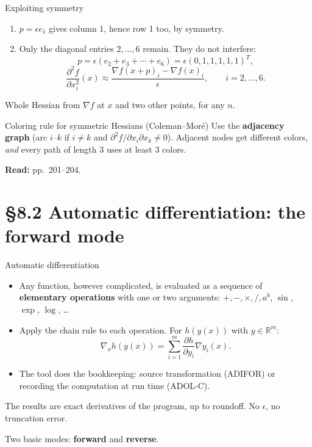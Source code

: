 \documentclass[12pt,aspectratio=169]{beamer}
\newcommand{\readpp}[1]{{\color{red!80!black}\textbf{Read:} #1}}
\newcommand{\eps}{\epsilon}
\newcommand{\R}{\mathbb{R}}
\begin{document}
\begin{frame}{Exploiting symmetry}
  \begin{enumerate}
    \item $p=\eps e_1$ gives column 1, hence row 1 too, by symmetry.
    \item Only the diagonal entries $2,\dots,6$ remain. They do not interfere:
      \begin{equation}
        p = \eps(e_2+e_3+\cdots+e_6) = \eps(0,1,1,1,1,1)^T, \tag{8.24}
      \end{equation}
      \[
        \frac{\partial^2 f}{\partial x_i^2}(x)\approx\frac{\nabla f(x+p)_i-\nabla f(x)_i}{\eps},\qquad i=2,\dots,6.
      \]
  \end{enumerate}
  \alert{Whole Hessian from $\nabla f$ at $x$ and two other points}, for any $n$.

  \begin{block}{Coloring rule for symmetric Hessians (Coleman--Mor\'e)}
    Use the \textbf{adjacency graph} (arc $i$--$k$ if $i\neq k$ and $\partial^2 f/\partial x_i\partial x_k\neq0$).
    Adjacent nodes get different colors, \emph{and} every path of length 3 uses at least 3 colors.
  \end{block}
  \readpp{pp.~201--204.}
\end{frame}

\section{\S8.2 Automatic differentiation: the forward mode}

\begin{frame}{Automatic differentiation}
  \begin{itemize}
    \item Any function, however complicated, is evaluated as a sequence of
      \textbf{elementary operations} with one or two arguments: $+,-,\times,/,a^b$, $\sin$, $\exp$, $\log$, \dots
    \item Apply the chain rule to each operation. For $h(y(x))$ with $y\in\R^m$:
      \begin{equation}
        \nabla_x h(y(x)) = \sum_{i=1}^m \frac{\partial h}{\partial y_i}\nabla y_i(x). \tag{8.25}
      \end{equation}
    \item The tool does the bookkeeping: source transformation (ADIFOR) or recording the computation at run time (ADOL-C).
  \end{itemize}
  The results are \alert{exact derivatives of the program}, up to roundoff. No $\eps$, no truncation error.

  Two basic modes: \textbf{forward} and \textbf{reverse}.
\end{frame}
\end{document}
